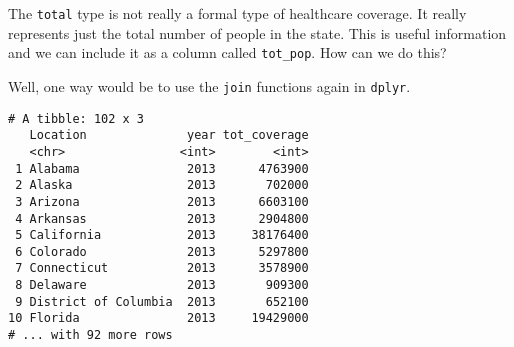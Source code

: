 \documentclass[]{article}
\newenvironment{Shaded}{\begin{snugshade}}{\end{snugshade}}
\newcommand{\DataTypeTok}[1]{\textcolor[rgb]{0.13,0.29,0.53}{#1}}
\newcommand{\KeywordTok}[1]{\textcolor[rgb]{0.13,0.29,0.53}{\textbf{#1}}}
\newcommand{\NormalTok}[1]{#1}
\newcommand{\OperatorTok}[1]{\textcolor[rgb]{0.81,0.36,0.00}{\textbf{#1}}}
\newcommand{\StringTok}[1]{\textcolor[rgb]{0.31,0.60,0.02}{#1}}
\begin{document}
The \texttt{total} type is not really a formal type of healthcare
coverage. It really represents just the total number of people in the
state. This is useful information and we can include it as a column
called \texttt{tot\_pop}. How can we do this?

Well, one way would be to use the \texttt{join} functions again in
\texttt{dplyr}.

\begin{Shaded}
\end{Shaded}

\begin{verbatim}
# A tibble: 102 x 3
   Location              year tot_coverage
   <chr>                <int>        <int>
 1 Alabama               2013      4763900
 2 Alaska                2013       702000
 3 Arizona               2013      6603100
 4 Arkansas              2013      2904800
 5 California            2013     38176400
 6 Colorado              2013      5297800
 7 Connecticut           2013      3578900
 8 Delaware              2013       909300
 9 District of Columbia  2013       652100
10 Florida               2013     19429000
# ... with 92 more rows
\end{verbatim}

\begin{Shaded}
\end{Shaded}
\end{document}
